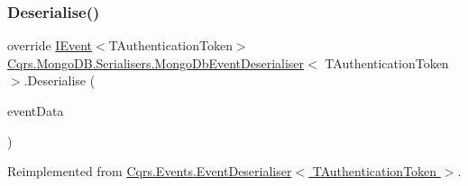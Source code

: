 \subsubsection{\texorpdfstring{Deserialise()}{Deserialise()}}
{\footnotesize\ttfamily override \hyperlink{interfaceCqrs_1_1Events_1_1IEvent}{I\+Event}$<$T\+Authentication\+Token$>$ \hyperlink{classCqrs_1_1MongoDB_1_1Serialisers_1_1MongoDbEventDeserialiser}{Cqrs.\+Mongo\+D\+B.\+Serialisers.\+Mongo\+Db\+Event\+Deserialiser}$<$ T\+Authentication\+Token $>$.Deserialise (\begin{DoxyParamCaption}\item[{\hyperlink{classCqrs_1_1Events_1_1EventData}{Event\+Data}}]{event\+Data }\end{DoxyParamCaption})\hspace{0.3cm}{\ttfamily [virtual]}}



Reimplemented from \hyperlink{classCqrs_1_1Events_1_1EventDeserialiser_a193feac1d58446f0a7447d8ba04179fc_a193feac1d58446f0a7447d8ba04179fc}{Cqrs.\+Events.\+Event\+Deserialiser$<$ T\+Authentication\+Token $>$}.


